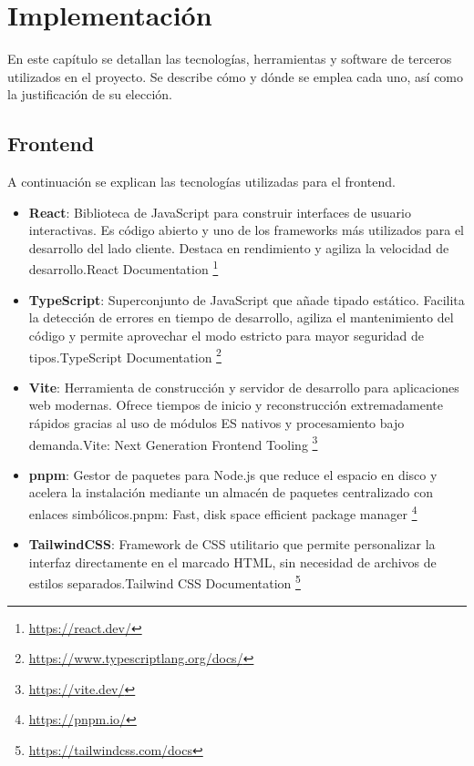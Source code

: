 \chapter{Implementación}
\label{chapter:5-Implementación}
En este capítulo se detallan las tecnologías, herramientas y software de terceros utilizados en el proyecto. Se describe cómo y dónde se emplea cada uno, así como la justificación de su elección.

\section{Frontend}
\label{section:5-frontend}
A continuación se explican las tecnologías utilizadas para el frontend.   

\begin{itemize}

\item \textbf{React}: Biblioteca de JavaScript para construir interfaces de usuario interactivas. Es código abierto y uno de los frameworks más utilizados para el desarrollo del lado cliente. Destaca en rendimiento y agiliza la velocidad de desarrollo.React Documentation \footnote{\url{https://react.dev/}}

\item \textbf{TypeScript}: Superconjunto de JavaScript que añade tipado estático. Facilita la detección de errores en tiempo de desarrollo, agiliza el mantenimiento del código y permite aprovechar el modo estricto para mayor seguridad de tipos.TypeScript Documentation \footnote{\url{https://www.typescriptlang.org/docs/}}

\item \textbf{Vite}: Herramienta de construcción y servidor de desarrollo para aplicaciones web modernas. Ofrece tiempos de inicio y reconstrucción extremadamente rápidos gracias al uso de módulos ES nativos y procesamiento bajo demanda.Vite: Next Generation Frontend Tooling \footnote{\url{https://vite.dev/}}

\item \textbf{pnpm}: Gestor de paquetes para Node.js que reduce el espacio en disco y acelera la instalación mediante un almacén de paquetes centralizado con enlaces simbólicos.pnpm: Fast, disk space efficient package manager \footnote{\url{https://pnpm.io/}}

\item \textbf{TailwindCSS}: Framework de CSS utilitario que permite personalizar la interfaz directamente en el marcado HTML, sin necesidad de archivos de estilos separados.Tailwind CSS Documentation \footnote{\url{https://tailwindcss.com/docs}}


\end{itemize}
